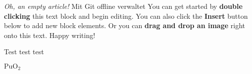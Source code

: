 

\textit{Oh, an empty article!}
Mit Git offline verwaltet
You can get started by \textbf{double clicking} this text block and begin editing. You can also click the \textbf{Insert} button below to add new block elements. Or you can \textbf{drag and drop an image} right onto this text. Happy writing!

  Test test test

$\text{PuO}_2$

  \PuOzwei



